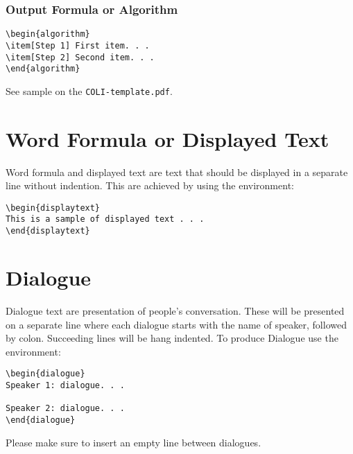 \documentclass{clv3}
\begin{document}
\subsubsection{Output Formula or Algorithm}

\begin{verbatim}
\begin{algorithm}
\item[Step 1] First item. . . 
\item[Step 2] Second item. . .
\end{algorithm}
\end{verbatim}


See sample on the {\tt COLI-template.pdf}.

\section{Word Formula or Displayed Text}

Word formula and displayed text are text that should be displayed in a 
separate line without indention. This are achieved by using the environment:

\begin{verbatim}
\begin{displaytext}
This is a sample of displayed text . . .
\end{displaytext}
\end{verbatim}

\section{Dialogue}

Dialogue text are presentation of people's conversation. These will be presented 
on a separate line where each dialogue starts with the name of speaker, followed by 
colon. Succeeding lines will be hang indented. To produce Dialogue use the environment:
\\
\begin{verbatim}
\begin{dialogue}
Speaker 1: dialogue. . .

Speaker 2: dialogue. . .
\end{dialogue}
\end{verbatim}


\noindent Please make sure to insert an empty line between dialogues.
\end{document}
